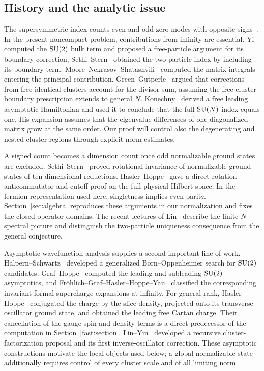 \subsection{History and the analytic issue}

The supersymmetric index counts even and odd zero modes with opposite
signs~\cite{Witten1982Index}. In the present noncompact problem,
contributions from infinity are essential. Yi~\cite{Yi1997} computed the
$\operatorname{SU}(2)$ bulk term and proposed a free-particle argument for its boundary correction;
Sethi--Stern~\cite{SethiStern1998} obtained the two-particle index by
including its boundary term. Moore--Nekrasov--Shatashvili~\cite{MNS2000}
computed the matrix integrals entering the principal contribution.
Green--Gutperle~\cite[Section~5]{GreenGutperle1998} argued that corrections
from free identical clusters account for the divisor sum, assuming the
free-cluster boundary prescription extends to general $N$.
Konechny~\cite[Sections~3 and~5]{Konechny1999} derived a free leading
asymptotic Hamiltonian and used it to conclude that the full $\operatorname{SU}(N)$
index equals one. His expansion assumes that the eigenvalue differences
of one diagonalized matrix grow at the same order. Our proof will
control also the degenerating and nested cluster regions through
explicit norm estimates.

A signed count becomes a dimension count once odd normalizable ground
states are excluded. Sethi--Stern~\cite[Sections~3.2 and~4.2]{SethiStern2000} proved rotational
invariance of normalizable ground states of ten-dimensional reductions.
Hasler--Hoppe~\cite[Theorem~1(a) and Lemma~2(c)]{HaslerHoppe2002} gave a direct
rotation anticommutator and cutoff proof on the full physical Hilbert
space. In the fermion representation used here, singletness implies
even parity. Section~\ref{sec:algebra} reproduces these arguments in
our normalization and fixes the closed operator domains. The recent
lectures of Lin~\cite[Section~3.1]{Lin2026v3} describe the finite-$N$ spectral picture
and distinguish the two-particle uniqueness consequence from the general
conjecture.

Asymptotic wavefunction analysis supplies a second important line of
work. Halpern--Schwartz~\cite{HalpernSchwartz1998} developed a generalized
Born--Oppenheimer search for $\operatorname{SU}(2)$ candidates. Graf--Hoppe~\cite{GrafHoppe1998}
computed the leading and subleading $\operatorname{SU}(2)$ asymptotics, and
Fr\"ohlich--Graf--Hasler--Hoppe--Yau~\cite[Section~3]{FroehlichEtAl2000} classified
the corresponding invariant formal supercharge expansions at infinity. For general rank, Hasler--Hoppe~\cite[pp.~2--5]{HaslerHoppeFactorization2002}
conjugated the charge by the slice density, projected onto its transverse
oscillator ground state, and obtained the leading free Cartan charge.
Their cancellation of the gauge-spin and density terms is a direct
predecessor of the computation in Section~\ref{fast:section}.
Lin--Yin~\cite[Sections~3.2 and~4]{LinYin2015} developed a recursive cluster-factorization
proposal and its first inverse-oscillator correction. These asymptotic
constructions motivate the local objects used below; a global
normalizable state additionally requires control of every cluster scale
and of all limiting norm.

